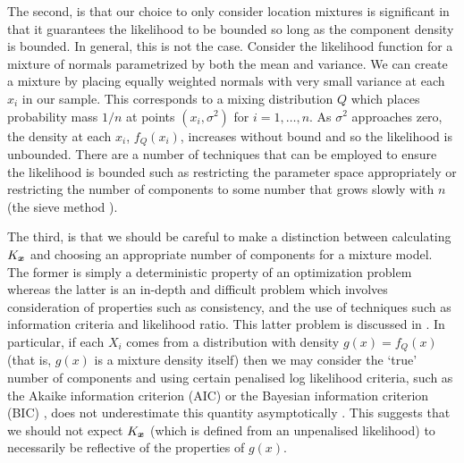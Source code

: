 	The second, is that our choice to only consider location mixtures is significant in that it guarantees the likelihood to be bounded so long as the component density is bounded. In general, this is not the case. Consider the likelihood function for a mixture of normals parametrized by both the mean and variance. We can create a mixture by placing equally weighted normals with very small variance at each $x_i$ in our sample. This corresponds to a mixing distribution $Q$ which places probability mass $1/n$ at points $(x_i, \sigma^2)$ for $i = 1, \dots, n$. As $\sigma^2$ approaches zero, the density at each $x_i$, $f_Q(x_i)$, increases without bound and so the likelihood is unbounded. There are a number of techniques that can be employed to ensure the likelihood is bounded such as restricting the parameter space appropriately or restricting the number of components to some number that grows slowly with $n$ (the sieve method \cite{Grenander1981-dy}).

	The third, is that we should be careful to make a distinction between calculating $K_{\bm{{x}}}$ and choosing an appropriate number of components for a mixture model. The former is simply a deterministic property of an optimization problem whereas the latter is an in-depth and difficult problem which involves consideration of properties such as consistency, and the use of techniques such as information criteria and likelihood ratio. This latter problem is discussed in \cite[Chapter 6]{McLachlan2004-ik}. In particular, if each $X_i$ comes from a distribution with density $g(x) = f_Q(x)$ (that is, $g(x)$ is a mixture density itself) then we may consider the `true' number of components and using certain penalised log likelihood criteria, such as the Akaike information criterion (AIC) \cite{Akaike1974-bl} or the Bayesian information criterion (BIC) \cite{Schwarz1978-ci}, does not underestimate this quantity asymptotically \cite{Leroux1992-ek}. This suggests that we should not expect $K_{\bm{{x}}}$ (which is defined from an unpenalised likelihood) to necessarily be reflective of the properties of $g(x)$.
 



